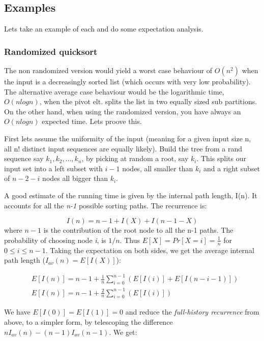 \documentclass[11pt]{article}
\begin{document}
\subsection{Examples}
Lets take an example of each and do some expectation analysis.

\subsubsection{Randomized quicksort}
 The non randomized version would yield a worst case behaviour of $O(n^2)$ when the input is a decreasingly sorted list (which occurs with very low probability). The alternative average case behaviour would be the logarithmic time, $O(nlogn)$, when the pivot elt. splits the list in two equally sized sub partitions. On the other hand, when using the randomized version, you have always an $O(nlogn)$ expected time. Lets proove this.
 
 First lets assume the uniformity of the input (meaning for a given input size n, all n! distinct input sequences are equally likely). Build the tree from a rand sequence say $k_1, k_2, \dots, k_n$, by picking at random a root, say $k_i$. This splits our input set into a left subset with $i-1$ nodes, all smaller than $k_i$ and a right subset of $n-2-i$ nodes all bigger than $k_i$. 

 A good estimate of the running time is given by the internal path length, I(n). It accounts for all the \textit{n-1} possible sorting paths. The recurrence is:
 
\begin{equation}
 I(n) = n - 1 + I(X) + I(n - 1 - X) 
\end{equation}
where $n-1$ is the contribution of the root node to all the n-1 paths. The probability of choosing node \textit{i}, is $1/n$. Thus $E[X] = Pr[X = i] = \frac{1}{n}$ for $0 \leq i \leq n-1$. Taking the expectation on both sides, we get the average internal path length ($I_{av}(n) = E[I(X)]$): 

\begin{equation}
\begin{split}
&  E[I(n)] = n - 1 + \frac{1}{n}\sum_{i=0}^{n-1}(E[I(i)]+E[I(n-i-1)]) \\
&  E[I(n)] = n - 1 + \frac{2}{n}\sum_{i=0}^{n-1}(E[I(i)])
\end{split}
\end{equation}

We have $E[I(0)] = E[I(1)] = 0$ and reduce the \textit{full-history recurrence} from above, to a simpler form, by telescoping the difference $nI_{av}(n)-(n-1)I_{av}(n-1)$. We get:
\end{document}
